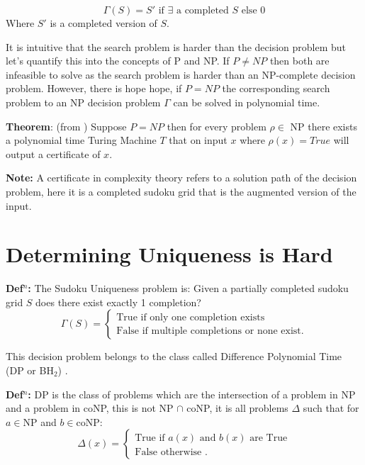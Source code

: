 \documentclass[a4paper,11pt]{report}
\begin{document}
\begin{equation}
\Gamma(S) = S' \text{ if $\exists$ a completed $S$ else 0}
\end{equation}
Where $S'$ is a completed version of $S$.

It is intuitive that the search problem is harder than the decision problem but let's quantify this into the concepts of P and NP. If $P \neq NP$ then both are infeasible to solve as the search problem is harder than an NP-complete decision problem. However, there is hope hope, if $P=NP$ the corresponding search problem to an NP decision problem $\Gamma$ can be solved in polynomial time. 

\textbf{Theorem}: (from \cite{compcomplexityamodernapproach}) Suppose $P=NP$ then for every problem $\rho\in$ NP there exists a polynomial time Turing Machine $T$ that on input $x$ where $\rho(x)=True$ will output a certificate of $x$.

\textbf{Note:} A certificate in complexity theory refers to a solution path of the decision problem, here it is a completed sudoku grid that is the augmented version of the input. 

\section{Determining Uniqueness is Hard}

\textbf{Def$^n$:} The Sudoku Uniqueness problem is: Given a partially completed sudoku grid $S$ does there exist exactly 1 completion?
\begin{equation}
\Gamma (S) = \begin{cases}
\text{True if only one completion exists} \\
\text{False if multiple completions or none exist}.
\end{cases}
\end{equation}

This decision problem belongs to the class called Difference Polynomial Time (DP or BH$_2$) \cite{dpcomplexity}.

\textbf{Def$^n$:} DP is the class of problems which are the intersection of a problem in NP and a problem in coNP, this is not NP $\cap$ coNP, it is all problems $\Delta$ such that for $a \in $NP and $b\in $coNP:
\begin{equation}
\Delta (x) = \begin{cases}
\text{True if $a(x)$ and $b(x)$ are True} \\
\text{False otherwise }.
\end{cases}
\end{equation}
\end{document}
